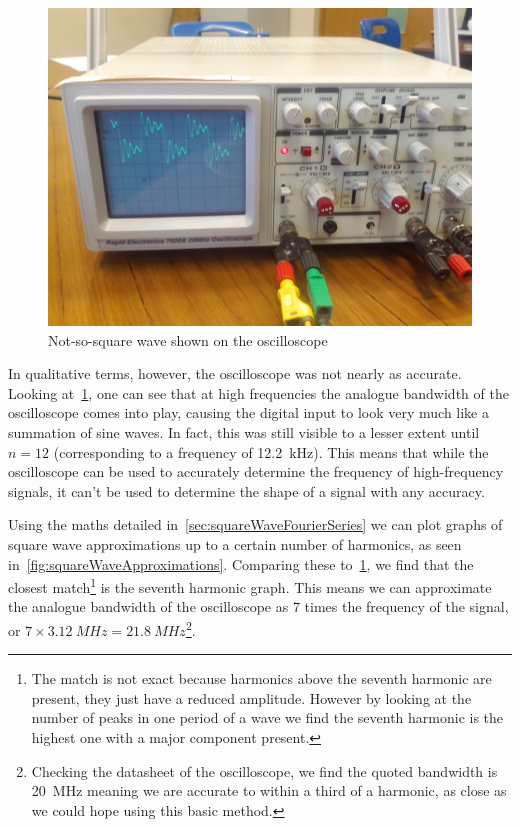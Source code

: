 \begin{figure}[h]
  \includegraphics[width=\textwidth]{img/experiments/scope/wave.jpg}
  \caption[CRO test waveform]{Not-so-square wave shown on the oscilloscope}
  \label{fig:oscilloscopeTestWave}
\end{figure}

In qualitative terms, however, the oscilloscope was not nearly as accurate.
Looking at~\cref{fig:oscilloscopeTestWave}, one can see that at high frequencies the analogue
bandwidth of the oscilloscope comes into play, causing the digital input to look
very much like a summation of sine waves. In fact, this was still visible to a
lesser extent until $n=12$ (corresponding to a frequency of \SI{12.2}{\kHz}).
This means that while the oscilloscope can be used to accurately determine the
frequency of high-frequency signals, it can't be used to determine the shape of
a signal with any accuracy.

Using the maths detailed in~\cref{sec:squareWaveFourierSeries} we can plot
graphs of square wave approximations up to a certain number of harmonics, as
seen in~\cref{fig:squareWaveApproximations}. Comparing these
to~\cref{fig:oscilloscopeTestWave}, we find that the closest match\footnote{The
  match is not exact because harmonics above the seventh harmonic are present,
  they just have a reduced amplitude.  However by looking at the number of peaks
  in one period of a wave we find the seventh harmonic is the highest one with a
  major component present.} is the seventh harmonic graph. This means we can
  approximate the analogue bandwidth of the oscilloscope as 7 times the
  frequency of the signal, or
  $7\times\SI{3.12}{MHz}=\SI{21.8}{MHz}$\footnote{Checking the datasheet of the
  oscilloscope, we find the quoted bandwidth is \SI{20}{MHz} meaning we are
accurate to within a third of a harmonic, as close as we could hope using this
basic method.}.

